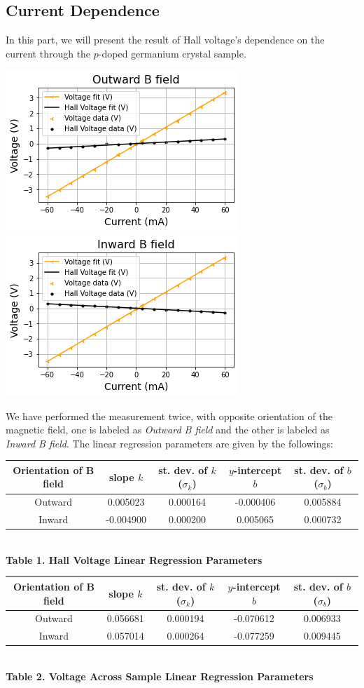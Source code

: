 \documentclass[11pt]{book}
\theoremstyle{break}
\theoremstyle{break}
\begin{document}
\subsection{Current Dependence}
In this part, we will present the result of Hall voltage's dependence on the current through the $p$-doped germanium crystal sample. 
\begin{center}
\includegraphics[scale=0.6]{1}
\includegraphics[scale=0.6]{2}
\end{center}
We have performed the measurement twice, with opposite orientation of the magnetic field, one is labeled as \textit{Outward B field} and the other is labeled as \textit{Inward B field}. The linear regression parameters are given by the followings:
\begin{center}
\begin{tabular}{|c|c|c|c|c|}
\hline
Orientation of B field & slope $k$ & st. dev. of $k$ ($\sigma_k$) & $y$-intercept $b$ & st. dev. of $b$ ($\sigma_b$)\\
\hline
Outward &  0.005023 & 0.000164 & -0.000406 & 0.005884\\
\hline
Inward & -0.004900 & 0.000200 & 0.005065 & 0.000732\\
\hline
\end{tabular}\\
\hfill\break
\textbf{Table 1. Hall Voltage Linear Regression Parameters}


\hfill\break
\hfill\break
\begin{tabular}{|c|c|c|c|c|}
\hline
Orientation of B field & slope $k$ & st. dev. of $k$ ($\sigma_k$) & $y$-intercept $b$ & st. dev. of $b$ ($\sigma_b$)\\
\hline
Outward &  0.056681 & 0.000194 & -0.070612 & 0.006933\\
\hline
Inward & 0.057014 & 0.000264 & -0.077259 & 0.009445\\
\hline
\end{tabular}\\
\hfill\break
\textbf{Table 2. Voltage Across Sample Linear Regression Parameters}
\end{center}
\end{document}
